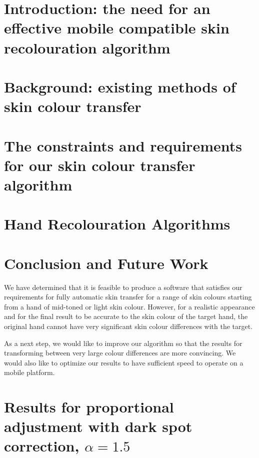\documentclass[12pt, a4paper]{article}
\begin{document}
\renewcommand{\thepage}{\arabic{page}}%
\setcounter{page}{1}

\section{Introduction: the need for an effective mobile compatible skin recolouration algorithm}

\pagebreak

\section{Background: existing methods of skin colour transfer}

\pagebreak

\section{The constraints and requirements for our skin colour transfer algorithm \label{sec:goals}}

\pagebreak

\section{Hand Recolouration Algorithms}

\pagebreak

\section{Conclusion and Future Work}
We have determined that it is feasible to produce a software that satisfies our requirements for fully automatic skin transfer for a range of skin colours starting from a hand of mid-toned or light skin colour. However, for a realistic appearance and for the final result to be accurate to the skin colour of the target hand, the original hand cannot have very significant skin colour differences with the target.

As a next step, we would like to improve our algorithm so that the results for transforming between very large colour differences are more convincing. We would also like to optimize our results to have sufficient speed to operate on a mobile platform.
\pagebreak



\pagebreak

\appendix
\section{Results for proportional adjustment with dark spot correction, $\alpha = 1.5$}\label{app:prop_corr_ave_a1p5}

\end{document}
